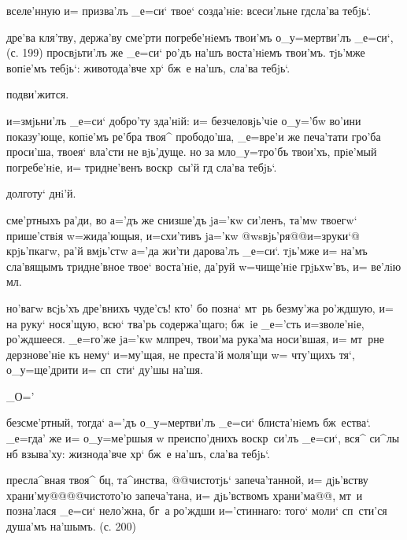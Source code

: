 

вселе'нную и= призва'лъ _е=си` твое` созда'нiе: 
всеси'льне гд сла'ва тебjь`.



дре'ва кля'тву, держа'ву сме'рти погребе'нiемъ твои'мъ 
о_у=мертви'лъ _е=си`, (с. 199) просвjьти'лъ же _е=си` 
ро'дъ на'шъ воста'нiемъ твои'мъ. тjь'мже вопiе'мъ тебjь`: 
животода'вче хр` бж~е на'шъ, сла'ва тебjь`.

подви'жится.

и=змjьни'лъ _е=си` добро'ту зда'нiй: и= безчеловjь'чiе 
о_у='бw во'ини показу'юще, копiе'мъ ре'бра твоя^ 
прободо'ша, _е=вре'и же печа'тати гро'ба проси'ша, твоея` 
вла'сти не вjь'дуще. но за мл о_у=тро'бъ твои'хъ, 
прiе'мый погребе'нiе, и= тридне'венъ воскр~сы'й гд 
сла'ва тебjь`.

долготу` днi'й.

сме'ртныхъ ра'ди, во а='дъ же снизше'дъ jа='кw си'ленъ, 
та'мw твоегw` прише'ствiя w=жида'ющыя, и=схи'тивъ jа='кw 
@w\т sвjь'ря@{@и=з\ъ руки`@} крjь'пкагw, ра'й вмjь'стw 
а='да жи'ти дарова'лъ _е=си`. тjь'мже и= на'мъ сла'вящымъ 
тридне'вное твое` воста'нiе, да'руй w=чище'нiе грjьхw'въ, 
и= ве'лiю мл.

но'вагw всjь'хъ дре'внихъ чуде'съ! кто' бо позна` мт~рь 
без\ъ му'жа ро'ждшую, и= на руку` нося'щую, всю` тва'рь 
содержа'щаго; бж~iе _е='сть и=зволе'нiе, ро'ждшееся. 
_е=го'же jа='кw мл преч, твои'ма рука'ма 
носи'вшая, и= мт~рне дерзнове'нiе къ нему` и=му'щая, не 
преста'й моля'щи w= чту'щихъ тя`, о_у=ще'дрити и= сп~сти` 
ду'шы на'шя.

_О='%


безсме'ртный, тогда` а='дъ о_у=мертви'лъ _е=си` 
блиста'нiемъ бж~ества`. _е=гда' же и= о_у=ме'ршыя w\т 
преиспо'днихъ воскр~си'лъ _е=си`, вся^ си^лы нб 
взыва'ху: жизнода'вче хр` бж~е на'шъ, сла'ва тебjь`.

пресла^вная твоя^ бц, та^инства, @@чистотjь` 
запеча'танной, и= дjь'вству храни'му@@{@@чистото'ю 
запеча'тана, и= дjь'вствомъ храни'ма@@}, мт~и позна'лася 
_е=си` нело'жна, бг~а ро'ждши и='стиннаго: того` моли` 
сп~сти'ся душа'мъ на'шымъ. (с. 200)
